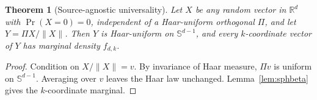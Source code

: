 \documentclass[10pt,a4paper]{amsart}
\newtheorem{theorem}{Theorem}
\newcommand{\bbR}{\mathbb{R}}
\newcommand{\bbS}{\mathbb{S}}
\begin{document}
\begin{theorem}[Source-agnostic universality]
\label{thm:univ}
Let $X$ be any random vector in $\bbR^d$ with $\Pr(X = 0) = 0$,
independent of a Haar-uniform orthogonal $\Pi$, and let
$Y = \Pi X / \|X\|$.  Then $Y$ is Haar-uniform on $\bbS^{d - 1}$,
and every $k$-coordinate vector of $Y$ has marginal density
$f_{d, k}$.
\end{theorem}

\begin{proof}
Condition on $X / \|X\| = v$.  By invariance of Haar measure,
$\Pi v$ is uniform on $\bbS^{d - 1}$.  Averaging over $v$ leaves the
Haar law unchanged.  Lemma~\ref{lem:sphbeta} gives the
$k$-coordinate marginal.
\end{proof}
\end{document}
